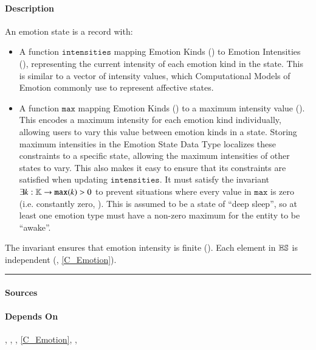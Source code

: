 \paragraph{Description} An emotion state is a record with:
\begin{itemize}

    \item A function $\mathtt{intensities}$ mapping Emotion Kinds
    () to Emotion Intensities
    (), representing the current intensity of each
    emotion kind in the state. This is similar to a vector of intensity values,
    which Computational Models of Emotion commonly use to represent affective
    states.

    \item A function $\mathtt{max}$ mapping Emotion Kinds
    () to a maximum intensity value
    (). This encodes a maximum intensity for each
    emotion kind individually, allowing users to vary this value between
    emotion kinds in a state. Storing maximum intensities in the Emotion State
    Data Type localizes these constraints to a specific state, allowing the
    maximum intensities of other states to vary. This also makes it easy to
    ensure that its constraints are satisfied when updating
    $\mathtt{intensities}$. It must satisfy the invariant $\exists k :
    \mathbb{K} \rightarrow \mathtt{max}(k) > 0 $ to prevent situations
    where every value in $\mathtt{max}$ is zero (i.e. constantly zero,
    ). This is assumed to be a state of ``deep
    sleep'', so at least one emotion type must have a non-zero maximum for the
    entity to be ``awake''.

\end{itemize}

\noindent The invariant ensures that emotion intensity is finite
(). Each element in $\mathbb{ES}$ is independent
(, \cref{C_Emotion}).\\\hrule

\paragraph{Sources} \citet[p.~358]{broekens2021emotion}

\paragraph{Depends On} , ,
, \cref{C_Emotion}, ,

